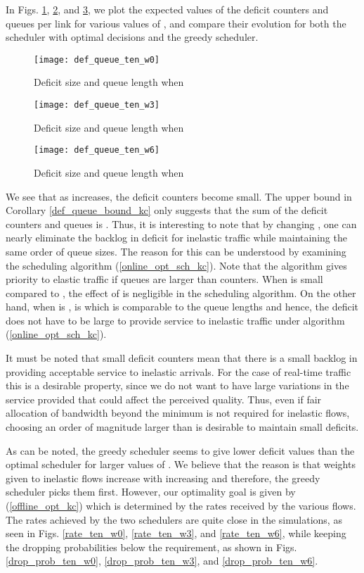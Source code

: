 \documentclass[conference]{IEEEtran}
\begin{document}
In Figs. \ref{def_queue_ten_w0}, \ref{def_queue_ten_w3}, and \ref{def_queue_ten_w6}, we plot the expected values of the deficit counters and queues per link for various values of , and compare their evolution for both the scheduler with optimal decisions and the greedy scheduler.

\begin{figure}[t]
	\centering
	\texttt{[image: def\_queue\_ten\_w0]}
	\caption{Deficit size and queue length when }
	\label{def_queue_ten_w0}
\end{figure}
\begin{figure}[t]
	\centering
	\texttt{[image: def\_queue\_ten\_w3]}
	\caption{Deficit size and queue length when }
	\label{def_queue_ten_w3}
\end{figure}
\begin{figure}[t]
	\centering
	\texttt{[image: def\_queue\_ten\_w6]}
	\caption{Deficit size and queue length when }
	\label{def_queue_ten_w6}
\end{figure}

We see that as  increases, the deficit counters become small. The upper bound in Corollary \ref{def_queue_bound_kc} only suggests that the sum of the deficit counters and queues is . Thus, it is interesting to note that by changing , one can nearly eliminate the backlog in deficit for inelastic traffic while maintaining the same order of queue sizes. The reason for this can be understood by examining the scheduling algorithm (\ref{online_opt_sch_kc}). Note that the algorithm gives priority to elastic traffic if queues are larger than counters. When  is small compared to , the effect of  is negligible in the scheduling algorithm. On the other hand, when  is ,  is  which is comparable to the queue lengths and hence, the deficit does not have to be large to provide service to inelastic traffic under algorithm (\ref{online_opt_sch_kc}).

It must be noted that small deficit counters mean that there is a small backlog in providing acceptable service to inelastic arrivals. For the case of real-time traffic this is a desirable property, since we do not want to have large variations in the service provided that could affect the perceived quality. Thus, even if fair allocation of bandwidth beyond the minimum is not required for inelastic flows, choosing  an order of magnitude larger than  is desirable to maintain small deficits.

As can be noted, the greedy scheduler seems to give lower deficit values than the optimal scheduler for larger values of . We believe that the reason is that weights given to inelastic flows increase with increasing  and therefore, the greedy scheduler picks them first. However, our optimality goal is given by (\ref{offline_opt_kc}) which is determined by the rates received by the various flows. The rates achieved by the two schedulers are quite close in the simulations, as seen in Figs. \ref{rate_ten_w0}, \ref{rate_ten_w3}, and \ref{rate_ten_w6}, while keeping the dropping probabilities below the requirement, as shown in Figs. \ref{drop_prob_ten_w0}, \ref{drop_prob_ten_w3}, and \ref{drop_prob_ten_w6}.
\end{document}
